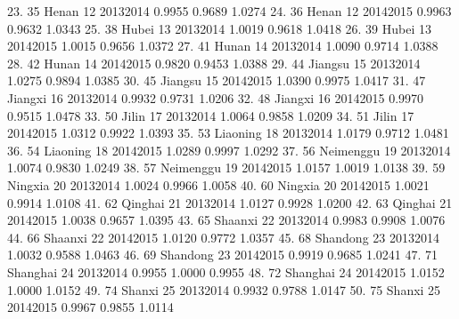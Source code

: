  23. {\VBAR}  35          Henan   12   2013{\tytilde}2014   0.9955   0.9689   1.0274 {\VBAR}
 24. {\VBAR}  36          Henan   12   2014{\tytilde}2015   0.9963   0.9632   1.0343 {\VBAR}
 25. {\VBAR}  38          Hubei   13   2013{\tytilde}2014   1.0019   0.9618   1.0418 {\VBAR}
 26. {\VBAR}  39          Hubei   13   2014{\tytilde}2015   1.0015   0.9656   1.0372 {\VBAR}
 27. {\VBAR}  41          Hunan   14   2013{\tytilde}2014   1.0090   0.9714   1.0388 {\VBAR}
 28. {\VBAR}  42          Hunan   14   2014{\tytilde}2015   0.9820   0.9453   1.0388 {\VBAR}
 29. {\VBAR}  44        Jiangsu   15   2013{\tytilde}2014   1.0275   0.9894   1.0385 {\VBAR}
 30. {\VBAR}  45        Jiangsu   15   2014{\tytilde}2015   1.0390   0.9975   1.0417 {\VBAR}
 31. {\VBAR}  47        Jiangxi   16   2013{\tytilde}2014   0.9932   0.9731   1.0206 {\VBAR}
 32. {\VBAR}  48        Jiangxi   16   2014{\tytilde}2015   0.9970   0.9515   1.0478 {\VBAR}
 33. {\VBAR}  50          Jilin   17   2013{\tytilde}2014   1.0064   0.9858   1.0209 {\VBAR}
 34. {\VBAR}  51          Jilin   17   2014{\tytilde}2015   1.0312   0.9922   1.0393 {\VBAR}
 35. {\VBAR}  53       Liaoning   18   2013{\tytilde}2014   1.0179   0.9712   1.0481 {\VBAR}
 36. {\VBAR}  54       Liaoning   18   2014{\tytilde}2015   1.0289   0.9997   1.0292 {\VBAR}
 37. {\VBAR}  56      Neimenggu   19   2013{\tytilde}2014   1.0074   0.9830   1.0249 {\VBAR}
 38. {\VBAR}  57      Neimenggu   19   2014{\tytilde}2015   1.0157   1.0019   1.0138 {\VBAR}
 39. {\VBAR}  59        Ningxia   20   2013{\tytilde}2014   1.0024   0.9966   1.0058 {\VBAR}
 40. {\VBAR}  60        Ningxia   20   2014{\tytilde}2015   1.0021   0.9914   1.0108 {\VBAR}
 41. {\VBAR}  62        Qinghai   21   2013{\tytilde}2014   1.0127   0.9928   1.0200 {\VBAR}
 42. {\VBAR}  63        Qinghai   21   2014{\tytilde}2015   1.0038   0.9657   1.0395 {\VBAR}
 43. {\VBAR}  65        Shaanxi   22   2013{\tytilde}2014   0.9983   0.9908   1.0076 {\VBAR}
 44. {\VBAR}  66        Shaanxi   22   2014{\tytilde}2015   1.0120   0.9772   1.0357 {\VBAR}
 45. {\VBAR}  68       Shandong   23   2013{\tytilde}2014   1.0032   0.9588   1.0463 {\VBAR}
 46. {\VBAR}  69       Shandong   23   2014{\tytilde}2015   0.9919   0.9685   1.0241 {\VBAR}
 47. {\VBAR}  71       Shanghai   24   2013{\tytilde}2014   0.9955   1.0000   0.9955 {\VBAR}
 48. {\VBAR}  72       Shanghai   24   2014{\tytilde}2015   1.0152   1.0000   1.0152 {\VBAR}
 49. {\VBAR}  74         Shanxi   25   2013{\tytilde}2014   0.9932   0.9788   1.0147 {\VBAR}
 50. {\VBAR}  75         Shanxi   25   2014{\tytilde}2015   0.9967   0.9855   1.0114 {\VBAR}
